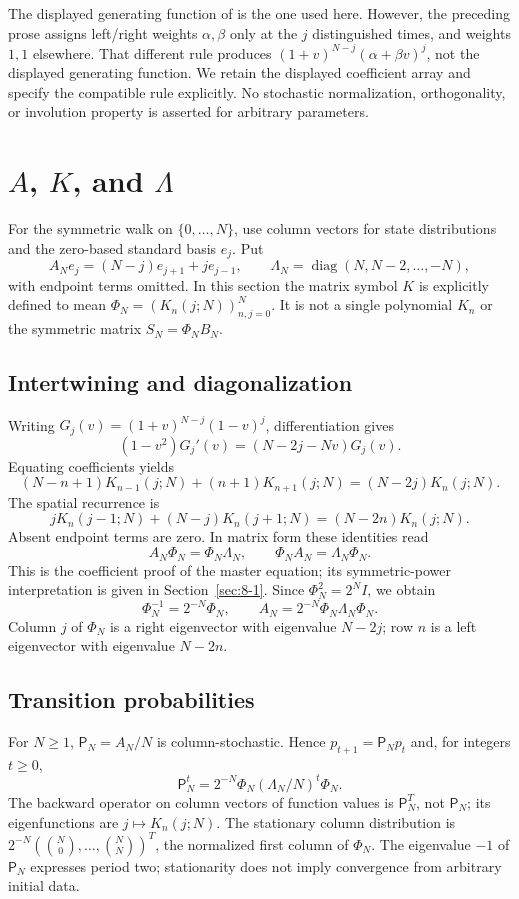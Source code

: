 \begin{remark}
The displayed generating function of \cite[Section~6.2]{KocikFeynman}
is the one used here. However, the preceding prose assigns left/right
weights $\alpha,\beta$ only at the $j$ distinguished times, and weights
$1,1$ elsewhere. That different rule produces
$(1+v)^{N-j}(\alpha+\beta v)^j$, not the displayed generating function.
We retain the displayed coefficient array and specify the compatible
rule explicitly. No stochastic normalization, orthogonality, or
involution property is asserted for arbitrary parameters.
\end{remark}

\section{$A$, $K$, and $\Lambda$}
\label{sec:2-2}
For the symmetric walk on $\{0,\ldots,N\}$, use column vectors for
state distributions and the zero-based standard basis $e_j$. Put
\[
A_Ne_j=(N-j)e_{j+1}+je_{j-1},\qquad
\Lambda_N=\operatorname{diag}(N,N-2,\ldots,-N),
\]
with endpoint terms omitted. In this section the matrix symbol $K$
is explicitly defined to mean $\Phi_N=(K_n(j;N))_{n,j=0}^N$.
It is not a single polynomial $K_n$ or the symmetric matrix
$S_N=\Phi_NB_N$.

\subsection{Intertwining and diagonalization}
Writing $G_j(v)=(1+v)^{N-j}(1-v)^j$, differentiation gives
\[
(1-v^2)G_j'(v)=(N-2j-Nv)G_j(v).
\]
Equating coefficients yields
\[
(N-n+1)K_{n-1}(j;N)+(n+1)K_{n+1}(j;N)
=(N-2j)K_n(j;N).
\]
The spatial recurrence is
\[
jK_n(j-1;N)+(N-j)K_n(j+1;N)=(N-2n)K_n(j;N).
\]
Absent endpoint terms are zero. In matrix form these identities read
\[
A_N\Phi_N=\Phi_N\Lambda_N,\qquad
\Phi_NA_N=\Lambda_N\Phi_N.
\]
This is the coefficient proof of the master equation; its symmetric-power
interpretation is given in Section~\ref{sec:8-1}.
Since $\Phi_N^2=2^NI$, we obtain
\[
\Phi_N^{-1}=2^{-N}\Phi_N,\qquad
A_N=2^{-N}\Phi_N\Lambda_N\Phi_N.
\]
Column $j$ of $\Phi_N$ is a right eigenvector with eigenvalue $N-2j$;
row $n$ is a left eigenvector with eigenvalue $N-2n$.

\subsection{Transition probabilities}
For $N\geq1$, $\mathsf P_N=A_N/N$ is column-stochastic. Hence
$p_{t+1}=\mathsf P_Np_t$ and, for integers $t\geq0$,
\[
\mathsf P_N^t=2^{-N}\Phi_N(\Lambda_N/N)^t\Phi_N.
\]
The backward operator on column vectors of function values is $\mathsf P_N^T$,
not $\mathsf P_N$; its eigenfunctions are $j\mapsto K_n(j;N)$.
The stationary column distribution is
$2^{-N}(\binom N0,\ldots,\binom NN)^T$, the normalized first column
of $\Phi_N$. The eigenvalue $-1$ of $\mathsf P_N$ expresses period two;
stationarity does not imply convergence from arbitrary initial data.

